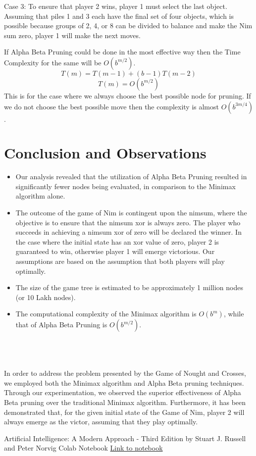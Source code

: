 \documentclass[conference]{IEEEtran}
\begin{document}
Case 3: To ensure that player 2 wins, player 1 must select the last object. Assuming that piles 1 and 3 each have the final set of four objects, which is possible because groups of 2, 4, or 8 can be divided to balance and make the Nim sum zero, player 1 will make the next moves.

If Alpha Beta Pruning could be done in the most effective way
then the Time Complexity for the same will be $O(b^{m/2})$.
\[T(m) = T(m − 1) + (b − 1)T(m − 2)\]
\[T(m) = O(b^{m/2})\]
This is for the case where we always choose the best possible
node for pruning. If we do not choose the best possible move
then the complexity is almost $O(b^{3m/4})$.

\section{Conclusion and Observations}
\begin{itemize}
    \item Our analysis revealed that the utilization of Alpha Beta Pruning resulted in significantly fewer nodes being evaluated, in comparison to the Minimax algorithm alone.
    \item The outcome of the game of Nim is contingent upon the nimsum, where the objective is to ensure that the nimsum xor is always zero. The player who succeeds in achieving a nimsum xor of zero will be declared the winner. In the case where the initial state has an xor value of zero, player 2 is guaranteed to win, otherwise player 1 will emerge victorious. Our assumptions are based on the assumption that both players will play optimally.
    \item The size of the game tree is estimated to be approximately 1 million nodes (or 10 Lakh nodes).
    \item The computational complexity of the Minimax algorithm is $O(b^m)$, while that of Alpha Beta Pruning is $O(b^{m/2})$.
\end{itemize}\\\\\\
In order to address the problem presented by the Game of Nought and Crosses, we employed both the Minimax algorithm and Alpha Beta pruning techniques. Through our experimentation, we observed the superior effectiveness of Alpha Beta pruning over the traditional Minimax algorithm. Furthermore, it has been demonstrated that, for the given initial state of the Game of Nim, player 2 will always emerge as the victor, assuming that they play optimally.
\begin{thebibliography}{00}
 Artificial Intelligence: A Modern Approach - Third Edition by Stuart J. Russell and Peter Norvig
 Colab Notebook
\href{https://colab.research.google.com/drive/10ap_6Dj1T4M317vHIrdVUzps1MWIPJ0a?usp=sharing}{Link to notebook}
\end{thebibliography}
\vspace{12pt}
\end{document}
